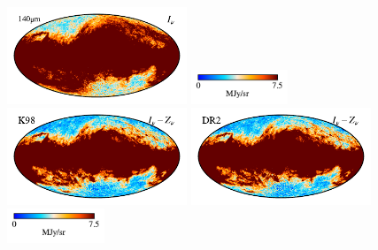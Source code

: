 \documentclass[twocolumn]{aa}
\begin{document}
\begin{figure}
    \includegraphics[height=2.90cm]{figs/compare_zsma/cosmoglobe_ma_09.pdf}%
    \includegraphics[width=2.90cm,angle=90]{figs/compare_zsma/cbar_tot_09.pdf}%
    \includegraphics[height=2.90cm]{figs/compare_zsma/dirbe_zsma_09.pdf}%
    \includegraphics[height=2.90cm]{figs/compare_zsma/cosmoglobe_zsma_09.pdf}%
    \includegraphics[width=2.90cm,angle=90]{figs/compare_zsma/cbar_09.pdf}%
      \\


\end{figure}
\end{document}
